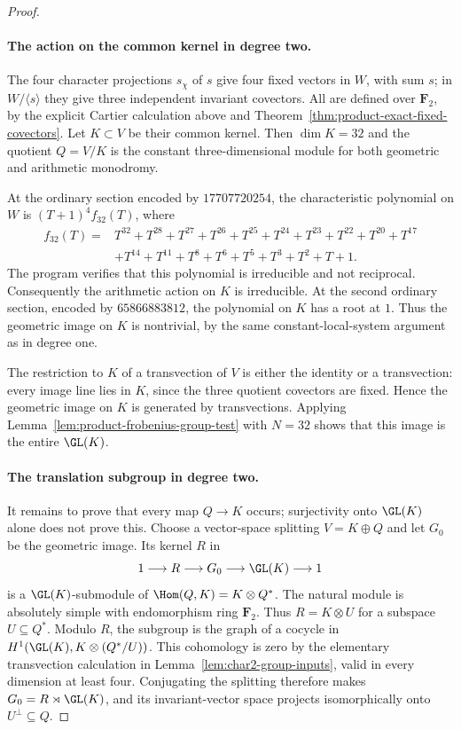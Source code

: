 \begin{proof}
\paragraph{The action on the common kernel in degree two.}
The four character projections $s_\chi$ of $s$ give four fixed
vectors in $W$, with sum $s$; in $W/\langle s\rangle$ they give
three independent invariant covectors.  All are defined over
$\mathbf F_2$, by the explicit Cartier calculation above and
Theorem~\ref{thm:product-exact-fixed-covectors}.
Let $K\subset V$ be their common kernel.  Then $\dim K=32$ and
the quotient $Q=V/K$ is the constant three-dimensional module
for both geometric and arithmetic monodromy.

At the ordinary section encoded by $17707720254$, the characteristic
polynomial on $W$ is $(T+1)^4f_{32}(T)$, where
\[
\begin{split}
 f_{32}(T)={}&T^{32}+T^{28}+T^{27}+T^{26}+T^{25}+T^{24}
             +T^{23}+T^{22}+T^{20}+T^{17}\\
            &+T^{14}+T^{11}+T^8+T^6+T^5+T^3+T^2+T+1.
\end{split}
\]
The program verifies that this polynomial is irreducible and not
reciprocal.  Consequently the arithmetic action on $K$ is
irreducible.  At the second ordinary section, encoded by
$65866883812$, the polynomial on $K$ has a root at $1$.
Thus the geometric image on $K$ is nontrivial, by the same
constant-local-system argument as in degree one.

The restriction to $K$ of a transvection of $V$ is either the
identity or a transvection: every image line lies in $K$, since
the three quotient covectors are fixed.  Hence the geometric
image on $K$ is generated by transvections.  Applying
Lemma~\ref{lem:product-frobenius-group-test} with $N=32$ shows
that this image is the entire $\GL(K)$.

\paragraph{The translation subgroup in degree two.}
It remains to prove that every map $Q\to K$ occurs; surjectivity
onto $\GL(K)$ alone does not prove this.
Choose a vector-space splitting $V=K\oplus Q$ and let $G_0$ be
the geometric image.  Its kernel $R$ in
\[
 1\longrightarrow R\longrightarrow G_0
          \longrightarrow\GL(K)\longrightarrow1
\]
is a $\GL(K)$-submodule of $\Hom(Q,K)=K\otimes Q^*$.
The natural module is absolutely simple with endomorphism ring
$\mathbf F_2$.  Thus $R=K\otimes U$ for a subspace $U\subseteq Q^*$.
Modulo $R$, the subgroup is the graph of a cocycle in
$H^1(\GL(K),K\otimes(Q^*/U))$.
This cohomology is zero by the elementary transvection calculation
in Lemma~\ref{lem:char2-group-inputs}, valid in every dimension
at least four.  Conjugating the splitting therefore makes
$G_0=R\rtimes\GL(K)$, and its invariant-vector space projects
isomorphically onto $U^\perp\subseteq Q$.


\end{proof}
